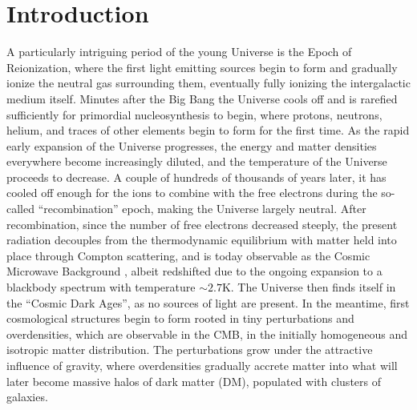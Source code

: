 \chapter*{Introduction}


A particularly intriguing period of the young Universe is the Epoch of Reionization, where the first
light emitting sources begin to form and gradually ionize the neutral gas surrounding them,
eventually fully ionizing the intergalactic medium itself.
Minutes after the Big Bang \citep[e.g.][]{moGalaxyFormationEvolution2010} the Universe cools off and
is rarefied sufficiently for primordial nucleosynthesis to begin, where protons, neutrons, helium,
and traces of other elements begin to form for the first time. As the rapid early expansion of the
Universe progresses, the energy and matter densities everywhere become increasingly diluted, and the
temperature of the Universe proceeds to decrease. A couple of hundreds of thousands of years later,
it has cooled off enough for the ions to combine with the free electrons during the so-called
``recombination'' epoch, making the Universe largely neutral. After recombination, since the number
of free electrons decreased steeply, the present radiation decouples from the thermodynamic
equilibrium with matter held into place through Compton scattering, and is today observable as the
Cosmic Microwave Background \citep[CMB,][]{peeblesPrinciplesPhysicalCosmology1993b}, albeit
redshifted due to the ongoing expansion to a blackbody spectrum with temperature
$\sim2.7$K. The Universe then finds itself in the ``Cosmic Dark Ages'', as no sources of light are present. In the meantime, first cosmological structures begin to form rooted in tiny perturbations and overdensities, which are observable in the CMB, in the initially homogeneous and isotropic matter distribution. The perturbations grow under the attractive influence of gravity, where overdensities gradually accrete matter into what will later become massive halos of dark matter (DM), populated with clusters of galaxies.

